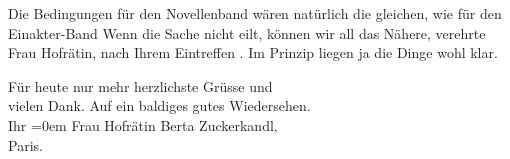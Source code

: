 \pstart
           Die Bedingungen für den Novellenband wären natürlich die gleichen, wie für den Einakter-Band{\dotstwo} Wenn die Sache nicht eilt, können wir all das Nähere,
               verehrte Frau Hofrätin, nach Ihrem Eintreffen \label{K_L03948-9v}\label{K_L03948-9}. Im
               Prinzip liegen ja die Dinge wohl klar.\pend
           
\pstart
           Für heute nur mehr herzlichste Grüsse und{\\[\baselineskip]} vielen Dank. Auf ein baldiges
               gutes Wiedersehen.{\\[\baselineskip]} Ihr\pend
           \leftskip=0em{}{\vspace{1\baselineskip}}
\pstart
           \noindent{}Frau Hofrätin Berta Zuckerkandl,{\\}Paris.\pend
           \endnumbering{}
\begin{anhang}
\end{anhang}\newcommand{\dateiname}{L03948}\newcommand{\titel}{Arthur Schnitzler an Berta Zuckerkandl, 29. 10. 1923}\newcommand{\editorInnen}{Herausgegeben von Jahnke, SelmaMüller, Martin Anton}
